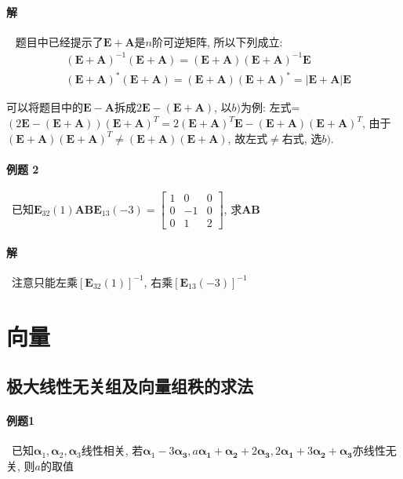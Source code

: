 \paragraph{解}~{} \noindent 题目中已经提示了$ \bm{E}+\bm{A} $是$ n $阶可逆矩阵, 所以下列成立:
\begin{equation*}
\begin{aligned}
& (\bm{E}+\bm{A})^{-1}(\bm{E}+\bm{A})=(\bm{E}+\bm{A})(\bm{E}+\bm{A})^{-1}\bm{E} \\
& (\bm{E}+\bm{A})^{*}(\bm{E}+\bm{A})=(\bm{E}+\bm{A})(\bm{E}+\bm{A})^{*}=|\bm{E}+\bm{A}|\bm{E}
\end{aligned}
\end{equation*}\par
可以将题目中的$ \bm{E}-\bm{A} $拆成$ 2\bm{E}-(\bm{E}+\bm{A}) $, 以$ b) $为例: 左式=$ (2 \bm{E}-(\bm{E}+\bm{A}))(\bm{E}+\bm{A})^{T}=2(\bm{E}+\bm{A})^{T}\bm{E}-(\bm{E}+\bm{A})(\bm{E}+\bm{A})^{T}$, 由于$ (\bm{E}+\bm{A})(\bm{E}+\bm{A})^{T}\neq (\bm{E}+\bm{A})(\bm{E}+\bm{A}) $, 故左式$ \neq $右式, 选$ b) $.
\paragraph{例题 2}~{已知$ \bm{E}_{32}(1)\bm{A}\bm{B}\bm{E}_{13}(-3)=
\begin{bmatrix}
1 & 0 & 0 \\
0 & -1 & 0 \\
0 & 1 & 2
\end{bmatrix}$, 求$ \bm{A}\bm{B} $}
\paragraph{解}~{注意只能左乘$ [\bm{E}_{32}(1)]^{-1} $, 右乘$ [\bm{E}_{13}(-3)]^{-1} $}
\section{向量}
\subsection{极大线性无关组及向量组秩的求法}
\paragraph{例题1}~{已知$ \bm{\alpha}_{1}, \bm{\alpha}_{2}, \bm{\alpha}_{3} $线性相关, 若$ \bm{\alpha}_{1}-3 \bm{\alpha_{3}}, a \bm{\alpha_{1}}+\bm{\alpha_{2}}+2 \bm{\alpha_{3}}, 2 \bm{\alpha_{1}}+3 \bm{\alpha_{2}}+\bm{\alpha_{3}} $亦线性无关, 则$ a $的取值} \label{初等变换不会改变矩阵的秩}

